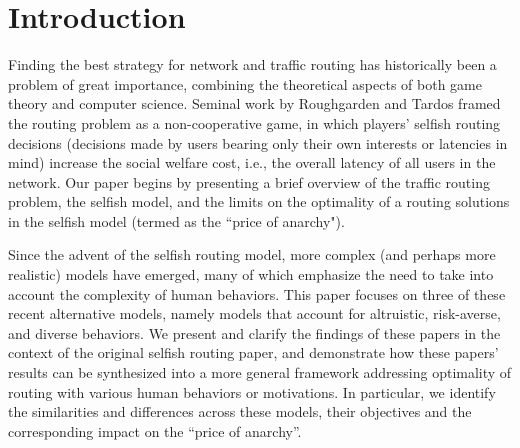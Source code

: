 \section{Introduction}
Finding the best strategy for network and traffic routing has historically been a problem of great importance, combining the theoretical aspects of both game theory and computer science. 
Seminal work by Roughgarden and Tardos framed the routing problem as a non-cooperative game,
in which players' selfish routing decisions (decisions made by users bearing only their own interests or latencies in mind) increase the social welfare cost, i.e., the overall latency of all users in the network.
Our paper begins by presenting a brief overview of the traffic routing problem, the selfish model, and the limits on the optimality of a routing solutions in the selfish model (termed as the ``price of anarchy"). 

Since the advent of the selfish routing model, more complex (and perhaps more realistic) models have emerged, many of which emphasize the need to take into account the complexity of human behaviors.
This paper focuses on three of these recent alternative models, namely models that account for altruistic, risk-averse, and diverse behaviors. We present and clarify the findings of these papers in the context of the original selfish routing paper, and demonstrate how these papers' results can be synthesized into a more general framework addressing optimality of routing with various human behaviors or motivations. In particular, we identify the similarities
and differences across these models, their objectives and the corresponding impact on the ``price of anarchy''.

